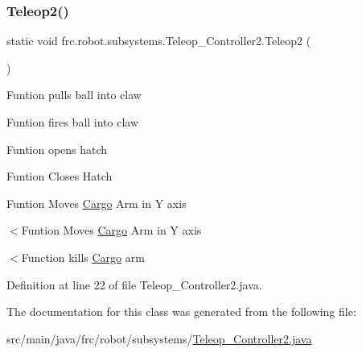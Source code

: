 \subsubsection{\texorpdfstring{Teleop2()}{Teleop2()}}
{\footnotesize\ttfamily static void frc.\+robot.\+subsystems.\+Teleop\+\_\+\+Controller2.\+Teleop2 (\begin{DoxyParamCaption}{ }\end{DoxyParamCaption})\hspace{0.3cm}{\ttfamily [static]}}

Funtion pulls ball into claw

Funtion fires ball into claw

Funtion opens hatch

Funtion Closes Hatch

Funtion Moves \hyperlink{classfrc_1_1robot_1_1subsystems_1_1Cargo}{Cargo} Arm in Y axis

$<$Funtion Moves \hyperlink{classfrc_1_1robot_1_1subsystems_1_1Cargo}{Cargo} Arm in Y axis

$<$Function kills \hyperlink{classfrc_1_1robot_1_1subsystems_1_1Cargo}{Cargo} arm 

Definition at line 22 of file Teleop\+\_\+\+Controller2.\+java.



The documentation for this class was generated from the following file\+:\begin{DoxyCompactItemize}
\item 
src/main/java/frc/robot/subsystems/\hyperlink{Teleop__Controller2_8java}{Teleop\+\_\+\+Controller2.\+java}\end{DoxyCompactItemize}
